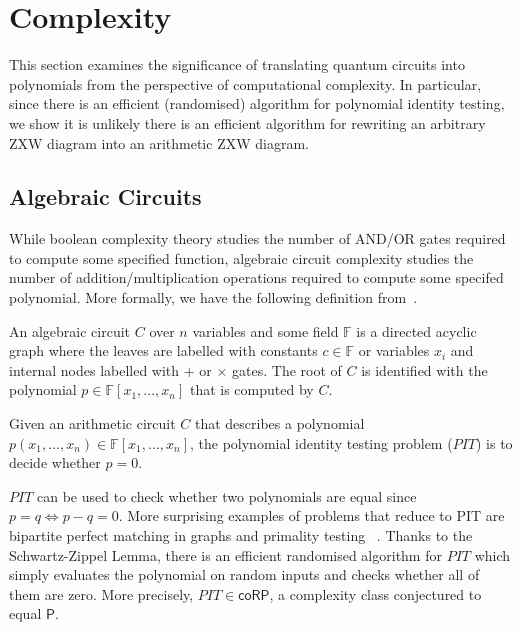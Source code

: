 \section{Complexity}

This section examines the significance of translating quantum circuits into polynomials from the perspective of computational complexity. In particular, since there is an efficient (randomised) algorithm for polynomial identity testing, we show it is unlikely there is an efficient algorithm for rewriting an arbitrary ZXW diagram into an arithmetic ZXW diagram.

\subsection{Algebraic Circuits}

While boolean complexity theory studies the number of AND/OR gates required to compute some specified function, algebraic circuit complexity studies the number of addition/multiplication operations required to compute some specifed polynomial. More formally, we have the following definition from~\cite{shpilka2010arithmetic}.

\begin{definition}
	An algebraic circuit $C$ over $n$ variables and some field $\mathbb{F}$ is a directed acyclic graph where the leaves are labelled with constants $c \in \mathbb{F}$ or variables $x_i$ and internal nodes labelled with $+$ or $\times$ gates. The root of $C$ is identified with the polynomial $p \in \mathbb{F}[x_1, ..., x_n]$ that is computed by $C$.
\end{definition}


\begin{definition}
    Given an arithmetic circuit $C$ that describes a polynomial $p(x_1, ..., x_n) \in \mathbb{F}[x_1, ..., x_n]$, the polynomial identity testing problem ($PIT$) is to decide whether $p = 0$.
\end{definition}

$PIT$ can be used to check whether two polynomials are equal since $p = q \iff p-q = 0$. More surprising examples of problems that reduce to PIT are bipartite perfect matching in graphs and primality testing ~\cite{saxena2009progress}. Thanks to the Schwartz-Zippel Lemma, there is an efficient randomised algorithm for $PIT$ which simply evaluates the polynomial on random inputs and checks whether all of them are zero. More precisely, $PIT \in \mathsf{coRP}$, a complexity class conjectured to equal $\mathsf{P}$.

